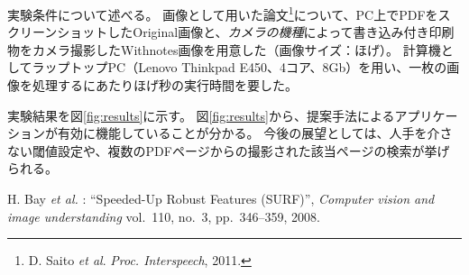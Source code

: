 \documentclass[a4paper, dvipdfmx]{jarticle}
\begin{document}
実験条件について述べる。
画像として用いた論文\footnote{D. Saito \textit{et al}. \textit{Proc. Interspeech}, 2011.}について、PC上でPDFをスクリーンショットしたOriginal画像と、\textit{カメラの機種}によって書き込み付き印刷物をカメラ撮影したWithnotes画像を用意した（画像サイズ：ほげ）。
計算機としてラップトップPC（Lenovo Thinkpad E450、4コア、8Gb）を用い、一枚の画像を処理するにあたりほげ秒の実行時間を要した。

実験結果を図\ref{fig:results}に示す。
図\ref{fig:results}から、提案手法によるアプリケーションが有効に機能していることが分かる。
今後の展望としては、人手を介さない閾値設定や、複数のPDFページからの撮影された該当ページの検索が挙げられる。

\footnotesize
\begin{thebibliography}{10}

H. Bay \textit{et al.} : ``Speeded-Up Robust Features (SURF)'',
\textit{Computer vision and image understanding} vol.~110,  no.~3, pp.~346--359, 2008.

\end{thebibliography}
\normalsize
\end{document}
